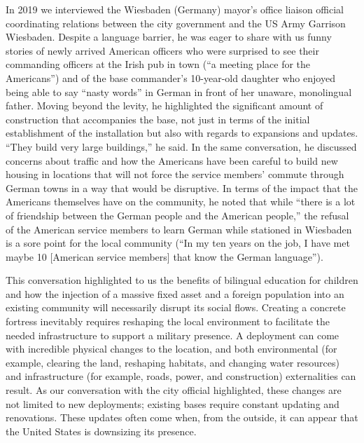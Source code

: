 In 2019 we interviewed the Wiesbaden (Germany) mayor's office liaison official coordinating relations between the city government and the US Army Garrison Wiesbaden. Despite a language barrier, he was eager to share with us funny stories of newly arrived American officers who were surprised to see their commanding officers at the Irish pub in town (``a meeting place for the Americans'') and of the base commander's 10-year-old daughter who enjoyed being able to say ``nasty words'' in German in front of her unaware, monolingual father. Moving beyond the levity, he highlighted the significant amount of construction that accompanies the base, not just in terms of the initial establishment of the installation but also with regards to expansions and updates. ``They build very large buildings,'' he said.\autocite{wiesbadenone20190725} In the same conversation, he discussed concerns about traffic and how the Americans have been careful to build new housing in locations that will not force the service members' commute through German towns in a way that would be disruptive. In terms of the impact that the Americans themselves have on the community, he noted that while ``there is a lot of friendship between the German people and the American people,'' the refusal of the American service members to learn German while stationed in Wiesbaden is a sore point for the local community (``In my ten years on the job, I have met maybe 10 [American service members] that know the German language'').


This conversation highlighted to us the benefits of bilingual education for children and how the injection of a massive fixed asset and a foreign population into an existing community will necessarily disrupt its social flows. Creating a concrete fortress inevitably requires reshaping the local environment to facilitate the needed infrastructure to support a military presence. A deployment can come with incredible physical changes to the location, and both environmental (for example, clearing the land, reshaping habitats, and changing water resources) and infrastructure (for example, roads, power, and construction) externalities can result. As our conversation with the city official highlighted, these changes are not limited to new deployments; existing bases require constant updating and renovations. These updates often come when, from the outside, it can appear that the United States is downsizing its presence. 


